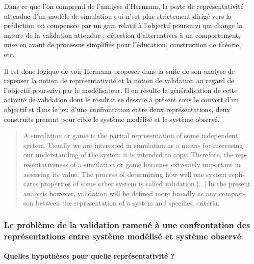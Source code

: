 Dans ce que l'on comprend de l'analyse d'Hermann, la perte de représentativité attendue d'un modèle de simulation qui n'est plus strictement dirigé vers la prédiction est compensée par un gain relatif à l'objectif poursuivi qui change la nature de la validation attendue : détection d'alternatives à un comportement, mise en avant de processus simplifiés pour l'éducation, construction de théorie, etc.

Il est donc logique de voir Hermann proposer dans la suite de son analyse de repenser la notion de représentativité et la notion de validation au regard de l'objectif poursuivi par le modélisateur. Il en résulte la généralisation de cette activité de validation dont le résultat se dessine à présent sous le couvert d'un objectif et dans le jeu d'une confrontation entre deux représentations, deux construits prenant pour cible le système modélisé et le système observé.

\foreignblockquote{english}[{\cite[216]{Hermann1967}}]{A simulation or game is the partial representation of some independent system. Usually we are interested in simulation as a means for increasing our understanding of the system it is intended to copy. Therefore, the representativeness of a simulation or game becomes extremely important in assessing its value. The process of determining how well one system replicates properties of some other system is called validation.[...] In the present analysis however, validation will be defined more broadly as any comparison between the representation of a system and specified criteria.} 

\subsubsection{Le problème de la validation ramené à une confrontation des représentations entre système modélisé et système observé}
\label{sssec:confrontation_sysmodelise_sysobserve}


\paragraph{Quelles hypothèses pour quelle représentativité ?}
\label{p:hypothese_representativite}

